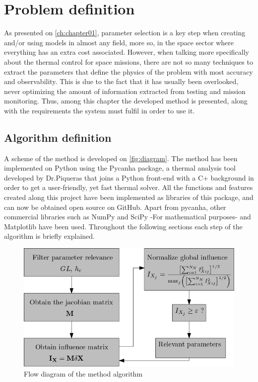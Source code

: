 \chapter{Problem definition}\label{ch:chapter02}
As presented on \autoref{ch:chapter01}, parameter selection is a key step when creating and/or using models in almost any field, more so, in the space sector where everything has an extra cost associated. However, when talking more specifically about the thermal control for space missions, there are not so many techniques to extract the parameters that define the physics of the problem with most accuracy and observability. This is due to the fact that it has usually been overlooked, never optimizing the amount of information extracted from testing and mission monitoring. Thus, among this chapter the developed method is presented, along with the requirements the system must fulfil in order to use it.

\section{Algorithm definition}
A scheme of the method is developed on \autoref{fig:diagram}. The method has been implemented on Python \cite{python} using the Pycanha package, a thermal analysis tool developed by Dr.Piqueras that joins a Python front-end with a C+ background in order to get a user-friendly, yet fast thermal solver. All the functions and features created along this project have been implemented as libraries of this package, and can now be obtained open source on GitHub. Apart from pycanha, other commercial libraries such as NumPy \cite{numpy} and SciPy \cite{scipy} -For mathematical purposes- and Matplotlib \cite{matplotlib} have been used. Throughout the following sections each step of the algorithm is briefly explained.

\begin{figure}[H]
    \centering
    \includegraphics[scale=0.5]{Figures/influence_diagram.png}
    \caption{Flow diagram of the method algorithm}
    \label{fig:diagram}
\end{figure}

